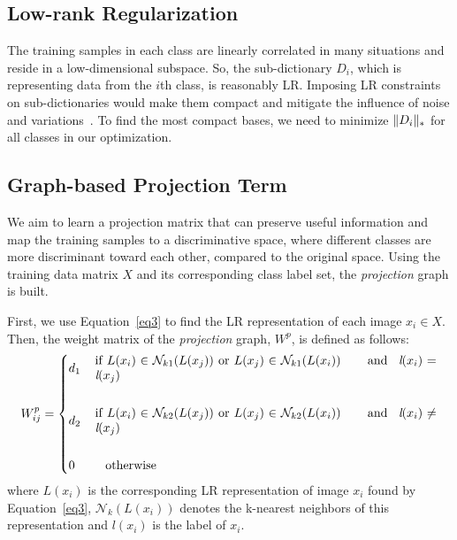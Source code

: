 \documentclass[journal]{IEEEtran}
\DeclarePairedDelimiter\norm{\lVert}{\rVert}
\begin{document}
\subsection{Low-rank Regularization}
The training samples in each class are linearly correlated in many situations and reside in a low-dimensional subspace. So, the sub-dictionary $D_i$, which is representing data from the $i$th class, is reasonably LR. Imposing LR constraints on sub-dictionaries would make them compact and mitigate the influence of noise and variations~\cite{D2L2R2}. To find the most compact bases, we need to minimize $\norm{D_i}_{*}$ for all classes in our optimization.
\subsection{Graph-based Projection Term}
We aim to learn a projection matrix that can preserve useful information and map the training samples to a discriminative space, where different classes are more discriminant toward each other, compared to the original space. Using the training data matrix $X$ and its corresponding class label set, the \textit{projection} graph is built.

First, we use Equation~\eqref{eq3} to find the LR representation of each image $x_i \in X$. Then, the weight matrix of the \textit{projection} graph, $W^p$, is defined as follows:
\begin{gather}
W^p_{ij} = 
\begin{dcases}
    d_1 & \, \parbox[c]{.8\columnwidth} {if $L(x_i) \in \mathcal N_{k1}(L(x_j))$ or $L(x_j) \in \mathcal N_{k1}(L(x_i))$ \hspace*{0.5cm} and \, $\textit{l}(x_i) = \textit{l}(x_j)$}\\
    \\
    d_2 & \, \parbox[c]{.8\columnwidth} {if $L(x_i) \in \mathcal N_{k2}(L(x_j))$ or $L(x_j) \in \mathcal N_{k2}(L(x_i))$ \hspace*{0.5cm} and \, $\textit{l}(x_i) \neq \textit{l}(x_j)$}\\
    \\
    0       & \quad \text{otherwise}\\
\end{dcases}
\label{eq7}
\end{gather}
where $L(x_i)$ is the corresponding LR representation of image $x_i$ found by Equation~\eqref{eq3}, $\mathcal N_{k}(L(x_i))$ denotes the k-nearest neighbors of this representation and $\textit{l}(x_i)$ is the label of $x_i$. 
\end{document}
